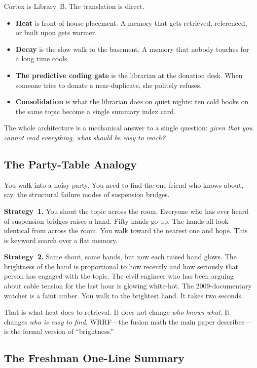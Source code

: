 \documentclass[11pt]{article}
\begin{document}
Cortex is Library~B.  The translation is direct.
\begin{itemize}
  \item \textbf{Heat} is front-of-house placement.  A memory that
        gets retrieved, referenced, or built upon gets warmer.
  \item \textbf{Decay} is the slow walk to the basement.  A memory
        that nobody touches for a long time cools.
  \item \textbf{The predictive coding gate} is the librarian at
        the donation desk.  When someone tries to donate a
        near-duplicate, she politely refuses.
  \item \textbf{Consolidation} is what the librarian does on quiet
        nights: ten cold books on the same topic become a single
        summary index card.
\end{itemize}

The whole architecture is a mechanical answer to a single question:
\emph{given that you cannot read everything, what should be easy to
reach?}

\subsection{The Party-Table Analogy}
\label{app:feynman-party}

You walk into a noisy party.  You need to find the one friend who
knows about, say, the structural failure modes of suspension
bridges.

\textbf{Strategy~1.} You shout the topic across the room.  Everyone
who has ever heard of suspension bridges raises a hand.  Fifty
hands go up.  The hands all look identical from across the room.
You walk toward the nearest one and hope.  This is keyword search
over a flat memory.

\textbf{Strategy~2.} Same shout, same hands, but now each raised
hand glows.  The brightness of the hand is proportional to how
recently and how seriously that person has engaged with the topic.
The civil engineer who has been arguing about cable tension for the
last hour is glowing white-hot.  The 2009-documentary watcher is a
faint amber.  You walk to the brightest hand.  It takes two
seconds.

That is what heat does to retrieval.  It does not change \emph{who
knows what}.  It changes \emph{who is easy to find}.  WRRF---the
fusion math the main paper describes---is the formal version of
``brightness.''

\subsection{The Freshman One-Line Summary}
\label{app:feynman-oneline}
\end{document}

